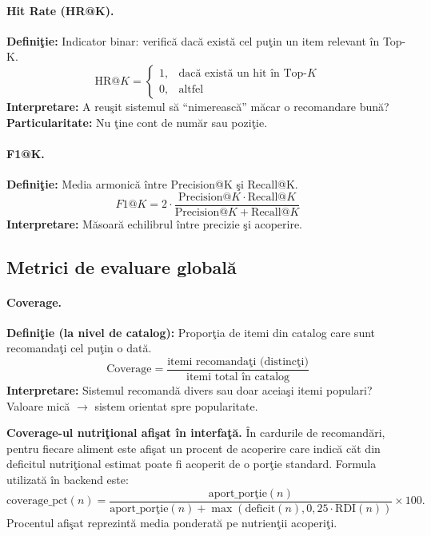 \documentclass[12pt,a4paper]{article}
\begin{document}
\paragraph{Hit Rate (HR@K).}
\textbf{Defini\c{t}ie:} Indicator binar: verific\u{a} dac\u{a} exist\u{a} cel pu\c{t}in un item relevant \^{i}n Top-K.
\begin{equation}
  \text{HR@}K = \begin{cases} 1, & \text{dac\u{a} exist\u{a} un hit \^{i}n Top-}K \\ 0, & \text{altfel} \end{cases}
\end{equation}
\textbf{Interpretare:} A reu\c{s}it sistemul s\u{a} ``nimereasc\u{a}'' m\u{a}car o recomandare bun\u{a}? \textbf{Particularitate:} Nu \c{t}ine cont de num\u{a}r sau pozi\c{t}ie.

\paragraph{F1@K.}
\textbf{Defini\c{t}ie:} Media armonic\u{a} între Precision@K \c{s}i Recall@K.
\begin{equation}
  F1\text{@}K = 2 \cdot \frac{\text{Precision@}K \cdot \text{Recall@}K}{\text{Precision@}K + \text{Recall@}K}
\end{equation}
\textbf{Interpretare:} M\u{a}soar\u{a} echilibrul între precizie \c{s}i acoperire.

\subsection*{Metrici de evaluare global\u{a}}

\paragraph{Coverage.}
\textbf{Defini\c{t}ie (la nivel de catalog):} Propor\c{t}ia de itemi din catalog care sunt recomanda\c{t}i cel pu\c{t}in o dat\u{a}.
\begin{equation}
  \text{Coverage} = \frac{\text{itemi recomanda\c{t}i (distinc\c{t}i)}}{\text{itemi total \^{i}n catalog}}
\end{equation}
\textbf{Interpretare:} Sistemul recomand\u{a} divers sau doar aceia\c{s}i itemi populari? Valoare mic\u{a} $\rightarrow$ sistem orientat spre popularitate.

\medskip

\noindent\textbf{Coverage-ul nutri\c{t}ional afi\c{s}at \^{i}n interfa\c{t}\u{a}.}
\^{I}n cardurile de recomand\u{a}ri, pentru fiecare aliment este afi\c{s}at un procent de acoperire care indic\u{a} c\u{a}t din deficitul nutri\c{t}ional estimat poate fi acoperit de o por\c{t}ie standard. Formula utilizat\u{a} \^{i}n backend este:
\begin{equation}
  \text{coverage\_pct}(n) = \frac{\text{aport\_por\c{t}ie}(n)}{\text{aport\_por\c{t}ie}(n) + \max(\text{deficit}(n), 0{,}25 \cdot \text{RDI}(n))} \times 100.
\end{equation}
Procentul afi\c{s}at reprezint\u{a} media ponderat\u{a} pe nutrien\c{t}ii acoperi\c{t}i.
\end{document}

